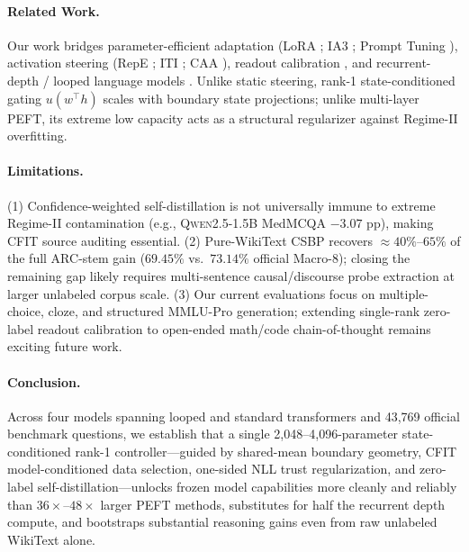 \documentclass[10pt,twocolumn]{article}
\begin{document}
\paragraph{Related Work.}
Our work bridges parameter-efficient adaptation (LoRA \citealp{hu2022lora}; IA3 \citealp{liu2022fewshot}; Prompt Tuning \citealp{lester2021power}), activation steering (RepE \citealp{zou2023representation}; ITI \citealp{li2023inference}; CAA \citealp{rimsky2024steering}), readout calibration \citep{holzman2021surface,zhao2021calibrate}, and recurrent-depth / looped language models \citep{dehghani2019universal,geiping2025scaling,ouro2025looped}. Unlike static steering, rank-1 state-conditioned gating $u(w^\top h)$ scales with boundary state projections; unlike multi-layer PEFT, its extreme low capacity acts as a structural regularizer against Regime-II overfitting.

\paragraph{Limitations.}
(1) Confidence-weighted self-distillation is not universally immune to extreme Regime-II contamination (e.g., \textsc{Qwen2.5-1.5B} MedMCQA $-3.07$ pp), making CFIT source auditing essential.
(2) Pure-WikiText CSBP recovers $\approx 40\%$--$65\%$ of the full ARC-stem gain ($69.45\%$ vs.\ $73.14\%$ official Macro-8); closing the remaining gap likely requires multi-sentence causal/discourse probe extraction at larger unlabeled corpus scale.
(3) Our current evaluations focus on multiple-choice, cloze, and structured MMLU-Pro generation; extending single-rank zero-label readout calibration to open-ended math/code chain-of-thought remains exciting future work.

\paragraph{Conclusion.}
Across four models spanning looped and standard transformers and 43,769 official benchmark questions, we establish that a single 2,048--4,096-parameter state-conditioned rank-1 controller---guided by shared-mean boundary geometry, CFIT model-conditioned data selection, one-sided NLL trust regularization, and zero-label self-distillation---unlocks frozen model capabilities more cleanly and reliably than $36\times$--$48\times$ larger PEFT methods, substitutes for half the recurrent depth compute, and bootstraps substantial reasoning gains even from raw unlabeled WikiText alone.



\end{document}
